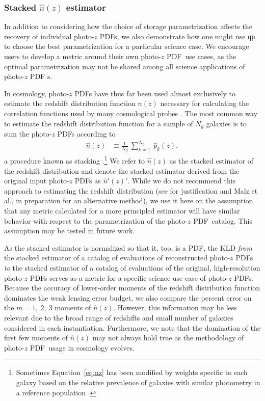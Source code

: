 \documentclass[\docopts]{\docclass}
\newcommand{\pz}{photo-$z$ PDF}
\begin{document}
\subsubsection{Stacked $\hat{n}(z)$ estimator}
\label{sec:stacked_metric}

In addition to considering how the choice of storage parametrization affects 
the recovery of individual \pz s, we also demonstrate how one might use 
\texttt{qp} to choose the best parametrization for a particular science case.
We encourage users to develop a metric around their own \pz\ use cases, as the 
optimal parametrization may not be shared among all science applications of \pz 
s.

In cosmology, \pz s have thus far been used almost exclusively to estimate the 
redshift distribution function $n(z)$ necessary for calculating the correlation 
functions used by many cosmological probes \citep{clampitt_galaxygalaxy_2017, 
hildebrandt_kids-450:_2017}.
The most common way to estimate the redshift distribution function for a sample 
of $N_{g}$ galaxies is to sum the \pz s according to
\begin{align}
  \label{eq:nz}
  \hat{n}(z) &\equiv \frac{1}{N_{g}}\ \sum_{k=1}^{N_{g}}\ \hat{p}_{k}(z),
\end{align}
a procedure known as stacking \citep{sheldon_photometric_2012, 
harnois-deraps_kids-450:_2017}.\footnote{Sometimes Equation~\ref{eq:nz} has 
been modified by weights specific to each galaxy based on the relative 
prevalence of galaxies with similar photometry in a reference population 
\citep{sheldon_photometric_2012, troster_cross-correlation_2017}.}
We refer to $\hat{n}(z)$ as the stacked estimator of the redshift distribution 
and denote the stacked estimator derived from the original input \pz s as 
$\hat{n}'(z)'$.
While we do not recommend this approach to estimating the redshift distribution 
(see \citet{choi_cfhtlens_2016} for justification and Malz et al., in 
preparation for an alternative method), we use it here on the assumption that 
any metric calculated for a more principled estimator will have similar 
behavior with respect to the parametrization of the \pz\ catalog.
This assumption may be tested in future work.

As the stacked estimator is normalized so that it, too, is a PDF, the KLD 
\textit{from} the stacked estimator of a catalog of evaluations of 
reconstructed \pz s \textit{to} the stacked estimator of a catalog of 
evaluations of the original, high-resolution \pz s serves as a metric for a 
specific science use case of \pz s.
Because the accuracy of lower-order moments of the redshift distribution 
function dominates the weak lensing error budget, we also compare the percent 
error on the $m=1,\ 2,\ 3$ moments of $\hat{n}(z)$.
However, this information may be less relevant due to the broad range of 
redshifts and small number of galaxies considered in each instantiation.
Furthermore, we note that the domination of the first few moments of 
$\hat{n}(z)$ may not always hold true as the methodology of \pz\ usage in 
cosmology evolves.
\end{document}
